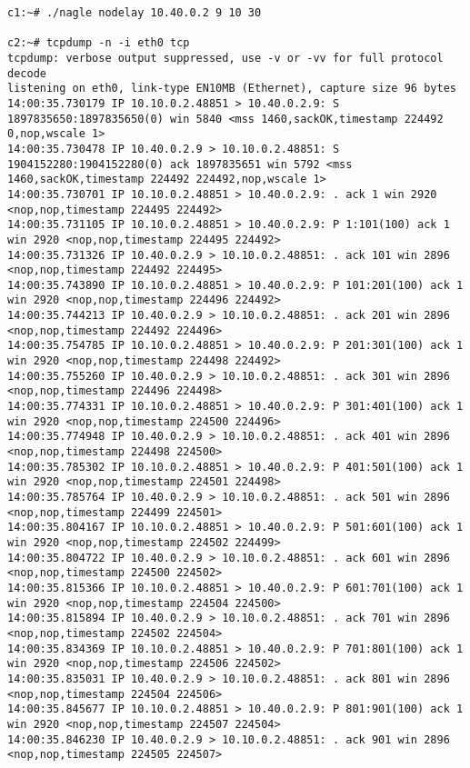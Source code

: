\documentclass[a4paper,12pt]{article}
\begin{document}
\begin{lstlisting}
c1:~# ./nagle nodelay 10.40.0.2 9 10 30

c2:~# tcpdump -n -i eth0 tcp
tcpdump: verbose output suppressed, use -v or -vv for full protocol decode
listening on eth0, link-type EN10MB (Ethernet), capture size 96 bytes
14:00:35.730179 IP 10.10.0.2.48851 > 10.40.0.2.9: S 1897835650:1897835650(0) win 5840 <mss 1460,sackOK,timestamp 224492 0,nop,wscale 1>
14:00:35.730478 IP 10.40.0.2.9 > 10.10.0.2.48851: S 1904152280:1904152280(0) ack 1897835651 win 5792 <mss 1460,sackOK,timestamp 224492 224492,nop,wscale 1>
14:00:35.730701 IP 10.10.0.2.48851 > 10.40.0.2.9: . ack 1 win 2920 <nop,nop,timestamp 224495 224492>
14:00:35.731105 IP 10.10.0.2.48851 > 10.40.0.2.9: P 1:101(100) ack 1 win 2920 <nop,nop,timestamp 224495 224492>
14:00:35.731326 IP 10.40.0.2.9 > 10.10.0.2.48851: . ack 101 win 2896 <nop,nop,timestamp 224492 224495>
14:00:35.743890 IP 10.10.0.2.48851 > 10.40.0.2.9: P 101:201(100) ack 1 win 2920 <nop,nop,timestamp 224496 224492>
14:00:35.744213 IP 10.40.0.2.9 > 10.10.0.2.48851: . ack 201 win 2896 <nop,nop,timestamp 224492 224496>
14:00:35.754785 IP 10.10.0.2.48851 > 10.40.0.2.9: P 201:301(100) ack 1 win 2920 <nop,nop,timestamp 224498 224492>
14:00:35.755260 IP 10.40.0.2.9 > 10.10.0.2.48851: . ack 301 win 2896 <nop,nop,timestamp 224496 224498>
14:00:35.774331 IP 10.10.0.2.48851 > 10.40.0.2.9: P 301:401(100) ack 1 win 2920 <nop,nop,timestamp 224500 224496>
14:00:35.774948 IP 10.40.0.2.9 > 10.10.0.2.48851: . ack 401 win 2896 <nop,nop,timestamp 224498 224500>
14:00:35.785302 IP 10.10.0.2.48851 > 10.40.0.2.9: P 401:501(100) ack 1 win 2920 <nop,nop,timestamp 224501 224498>
14:00:35.785764 IP 10.40.0.2.9 > 10.10.0.2.48851: . ack 501 win 2896 <nop,nop,timestamp 224499 224501>
14:00:35.804167 IP 10.10.0.2.48851 > 10.40.0.2.9: P 501:601(100) ack 1 win 2920 <nop,nop,timestamp 224502 224499>
14:00:35.804722 IP 10.40.0.2.9 > 10.10.0.2.48851: . ack 601 win 2896 <nop,nop,timestamp 224500 224502>
14:00:35.815366 IP 10.10.0.2.48851 > 10.40.0.2.9: P 601:701(100) ack 1 win 2920 <nop,nop,timestamp 224504 224500>
14:00:35.815894 IP 10.40.0.2.9 > 10.10.0.2.48851: . ack 701 win 2896 <nop,nop,timestamp 224502 224504>
14:00:35.834369 IP 10.10.0.2.48851 > 10.40.0.2.9: P 701:801(100) ack 1 win 2920 <nop,nop,timestamp 224506 224502>
14:00:35.835031 IP 10.40.0.2.9 > 10.10.0.2.48851: . ack 801 win 2896 <nop,nop,timestamp 224504 224506>
14:00:35.845677 IP 10.10.0.2.48851 > 10.40.0.2.9: P 801:901(100) ack 1 win 2920 <nop,nop,timestamp 224507 224504>
14:00:35.846230 IP 10.40.0.2.9 > 10.10.0.2.48851: . ack 901 win 2896 <nop,nop,timestamp 224505 224507>

\end{lstlisting}
\end{document}
